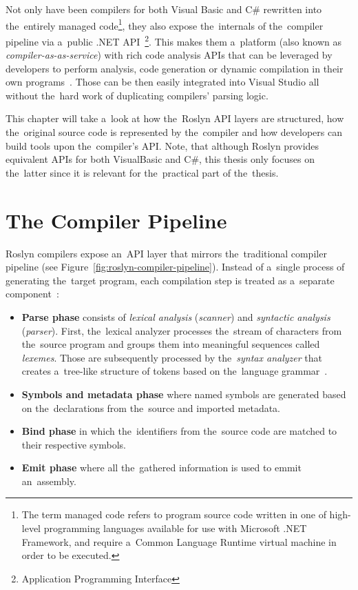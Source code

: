 \documentclass[
  digital, %
  table,   %
  lof,     %
  lot,     %
  oneside,
]{fithesis3}
\begin{document}
Not only have been compilers for both Visual Basic and C\# rewritten into the~entirely managed code\footnote{The term managed code refers to program source code written in one of high-level programming languages available for use with Microsoft .NET Framework, and require a~Common Language Runtime virtual machine in order to be executed.}, they also expose the~internals of the~compiler pipeline via a~public .NET API~\footnote{Application Programming Interface}. This makes them a~platform (also known as \textit{compiler-as-as-service}) with rich code analysis APIs that can be leveraged by developers to perform analysis, code generation or dynamic compilation in their own programs~\cite{roslyn-succinctly}. Those can be then easily integrated into Visual Studio all without the~hard work of duplicating compilers' parsing logic.

This chapter will take a~look at how the~Roslyn API layers are structured, how the~original source code is represented by the~compiler and how developers can build tools upon the~compiler's API. Note, that although Roslyn provides equivalent APIs for both VisualBasic and C\#, this thesis only focuses on the~latter since it is relevant for the~practical part of the~thesis.  
  
\section{The Compiler Pipeline}
Roslyn compilers expose an~API layer that mirrors the~traditional compiler pipeline (see Figure~\ref{fig:roslyn-compiler-pipeline}). Instead of a~single process of generating the~target program, each compilation step is treated as a~separate component~\cite{roslyn-overview}:

\begin{itemize}
  \item \textbf{Parse phase} consists of \textit{lexical analysis} (\textit{scanner}) and \textit{syntactic analysis} (\textit{parser}). First, the~lexical analyzer processes the~stream of characters from the~source program and groups them into meaningful sequences called \textit{lexemes}. Those are subsequently processed by the~\textit{syntax analyzer} that creates a~tree-like structure of tokens based on the~language grammar~\cite{dragon-book}.

  \item \textbf{Symbols and metadata phase} where named symbols are generated based on the~declarations from the~source and imported metadata.

  \item \textbf{Bind phase} in which the~identifiers from the~source code are matched to their respective symbols.

  \item \textbf{Emit phase} where all the~gathered information is used to emmit an~assembly.
\end{itemize}
\end{document}
